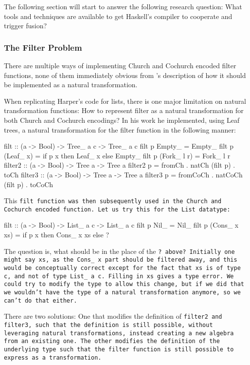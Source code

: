 The following section will start to answer the following research question:
What tools and techniques are available to get Haskell's compiler to cooperate and trigger fusion?

\subsubsection{The Filter Problem}\label{sec:filter_prob}
There are multiple ways of implementing Church and Cochurch encoded filter functions, none of them immediately obvious from \cite{Harper2011}'s description of how it should be implemented as a natural transformation.

When replicating Harper's code for lists, there is one major limitation on natural transformation functions:
How to represent filter as a natural transformation for both Church and Cochurch encodings?
In his work he implemented, using Leaf trees, a natural transformation for the filter function in the following manner:
\begin{spec}
filt :: (a -> Bool) -> Tree_ a c -> Tree_ a c
filt p Empty_ = Empty_
filt p (Leaf_ x) = if p x then Leaf_ x else Empty_
filt p (Fork_ l r) = Fork_ l r
filter2 :: (a -> Bool) -> Tree a -> Tree a
filter2 p = fromCh . natCh (filt p) . toCh
filter3 :: (a -> Bool) -> Tree a -> Tree a
filter3 p = fromCoCh . natCoCh (filt p) . toCoCh
\end{spec}
This \tt{filt} function was then subsequently used in the Church and Cochurch encoded function.
Let us try this for the \tt{List} datatype:
\begin{spec}
filt :: (a -> Bool) -> List_ a c -> List_ a c
filt p Nil_ = Nil_
filt p (Cons_ x xs) = if p x then Cons_ x xs else ? 
\end{spec}
The question is, what should be in the place of the \tt{?} above?
Initially one might say \tt{xs}, as the \tt{Cons\_ x} part should be filtered away, and this would be conceptually correct except for the fact that \tt{xs} is of type \tt{c}, and not of type \tt{List\_ a c}.
Filling in \tt{xs} gives a type error.
We could try to modify the type to allow this change, but if we did that we wouldn't have the type of a natural transformation anymore, so we can't do that either.

There are two solutions:
One that modifies the definition of \tt{filter2} and \tt{filter3}, such that the definition is still possible, without leveraging natural transformations, instead creating a new algebra from an existing one.
The other modifies the definition of the underlying type such that the filter function is still possible to express as a transformation.
    
